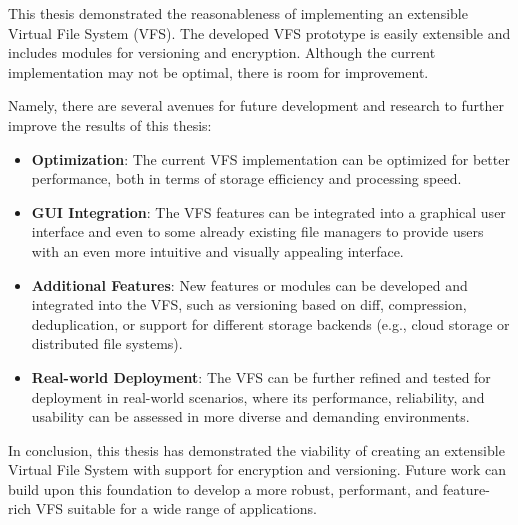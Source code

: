 

This thesis demonstrated the reasonableness of implementing an extensible Virtual File System (VFS).
The developed VFS prototype is easily extensible and includes modules for versioning and encryption.
Although the current implementation may not be optimal, there is room for improvement.

Namely, there are several avenues for future development and research to further improve the results of this thesis:

\begin{itemize}
    \item \textbf{Optimization}: The current VFS implementation can be optimized for better performance, both in terms of storage efficiency and processing speed.
    \item \textbf{GUI Integration}: The VFS features can be integrated into a graphical user interface and even to some already existing file managers to provide users with an even more intuitive and visually appealing interface.
    \item \textbf{Additional Features}: New features or modules can be developed and integrated into the VFS, such as versioning based on diff, compression, deduplication, or support for different storage backends (e.g., cloud storage or distributed file systems).
    \item \textbf{Real-world Deployment}: The VFS can be further refined and tested for deployment in real-world scenarios, where its performance, reliability, and usability can be assessed in more diverse and demanding environments.
\end{itemize}

In conclusion, this thesis has demonstrated the viability of creating an extensible Virtual File System with support for encryption and versioning.
Future work can build upon this foundation to develop a more robust, performant, and feature-rich VFS suitable for a wide range of applications.
